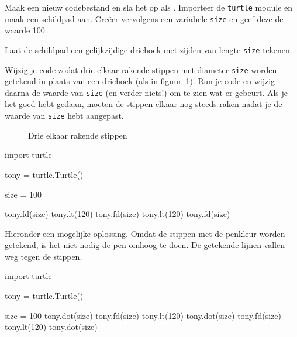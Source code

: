 \documentclass[../main]{subfiles}
\begin{document}
\begin{opgave}[icons={laptop}]
Maak een nieuw codebestand en sla het op als . Importeer de \texttt{turtle} module en maak een schildpad aan. Creëer vervolgens een variabele \texttt{size} en geef deze de waarde 100.
\begin{qlist}
\item Laat de schildpad een gelijkzijdige driehoek met zijden van lengte \texttt{size} tekenen.
\item Wijzig je code zodat drie elkaar rakende stippen met diameter \texttt{size} worden getekend in plaats van een driehoek (als in figuur~\ref{fig:turtle-dots-triangle}). Run je code en wijzig daarna de waarde van \texttt{size} (en verder niets!) om te zien wat er gebeurt. Als je het goed hebt gedaan, moeten de stippen elkaar nog steeds raken nadat je de waarde van \texttt{size} hebt aangepast.

\begin{figure}[ht]
    \centering
    \caption{Drie elkaar rakende stippen}%
    \label{fig:turtle-dots-triangle}
\end{figure}
\end{qlist}
\end{opgave}
\begin{antwoord}
\begin{qlist}
\item%
\begin{python-breakable}[style=mu-noframe]
import turtle

tony = turtle.Turtle()

size = 100

tony.fd(size)
tony.lt(120)
tony.fd(size)
tony.lt(120)
tony.fd(size)
\end{python-breakable}
\item Hieronder een mogelijke oplossing. Omdat de stippen met de penkleur worden getekend, is het niet nodig de pen omhoog te doen. De getekende lijnen vallen weg tegen de stippen.
\begin{python-breakable}[style=mu-noframe]
import turtle

tony = turtle.Turtle()

size = 100
tony.dot(size)
tony.fd(size)
tony.lt(120)
tony.dot(size)
tony.fd(size)
tony.lt(120)
tony.dot(size)
\end{python-breakable}
\end{qlist}

\end{antwoord}
\end{document}
